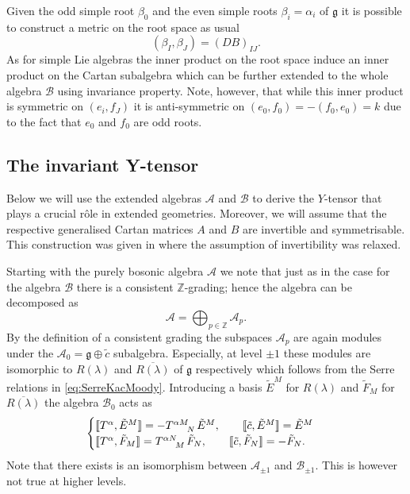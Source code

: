 Given the odd simple root $\beta_0$ and the even simple roots $\beta_i=\alpha_i$ of $\mathfrak{g}$ it is possible to construct a metric on the root space as usual
\begin{equation}
    (\beta_I,\beta_J) = (DB)_{IJ}.
\end{equation}
As for simple Lie algebras the inner product on the root space induce an inner product on the Cartan subalgebra which can be further extended to the whole algebra $\mathscr{B}$ using invariance property. Note, however, that while this inner product is symmetric on $(e_i,f_J)$ it is anti-symmetric on $(e_0,f_0)=-(f_0,e_0)=k$ due to the fact that $e_0$ and $f_0$ are odd roots.    


\subsection{The invariant Y-tensor\label{sec:InvYTensor}}
Below we will use the extended algebras $\mathscr{A}$ and $\mathscr{B}$ to derive the $Y$-tensor that plays a crucial rôle in extended geometries. Moreover, we will assume that the respective generalised Cartan matrices $A$ and $B$ are invertible and symmetrisable. This construction was given in \cite{CederwallPalmkvist2017} where the assumption of invertibility was relaxed.

Starting with the purely bosonic algebra $\mathscr{A}$ we note that just as in the case for the algebra $\mathscr{B}$ there is a consistent $\mathbb{Z}$-grading; hence the algebra can be decomposed as 
\begin{equation}
    \mathscr{A} =\bigoplus_{p\in \mathbb{Z}}\mathscr{A}_p.
\end{equation}
By the definition of a consistent grading the subspaces $\mathscr{A}_p$ are again modules under the $\mathscr{A}_0=\mathfrak{g}\oplus \tilde{c}$ subalgebra. Especially, at level $\pm 1$ these modules are isomorphic to $R(\lambda)$ and $\overbar{R(\lambda)}$ of $\mathfrak{g}$ respectively which follows from the Serre relations in \eqref{eq:SerreKacMoody}. Introducing a basis $\tilde{E}^M$ for $R(\lambda)$ and $\tilde{F}_M$ for $\overbar{R(\lambda)}$ the algebra $\mathscr{B}_{0}$ acts as 
\begin{equation}\label{eq:A0Action}
    \begin{cases}
        \llbracket T^\alpha, \tilde{E}^M\rrbracket = -\tensor{T}{^{\alpha M}_N}\tilde{E}^M,\qquad \llbracket \tilde{c},\tilde{E}^M\rrbracket= \tilde{E}^M\\
        \llbracket T^\alpha, \tilde{F}_M\rrbracket = \tensor{T}{^{\alpha N}_M}\tilde{F}_N,\qquad \llbracket \tilde{c},\tilde{F}_N\rrbracket= -\tilde{F}_N. 
    \end{cases}
\end{equation}
Note that there exists is an isomorphism between $\mathscr{A}_{\pm 1}$ and $\mathscr{B}_{\pm 1}$. This is however not true at higher levels. 


